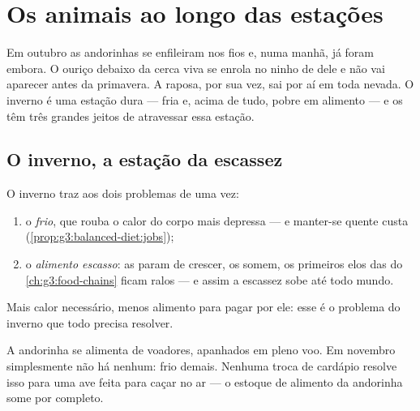 \chapter{Os animais ao longo das estações}\label{ch:g3:animals-through-seasons}

Em outubro as andorinhas se enfileiram nos fios e, numa manhã, já
foram embora. O ouriço debaixo da cerca viva se enrola no ninho de
 dele e não vai aparecer antes da primavera. A raposa, por sua
vez, sai por aí em toda nevada. O inverno é uma estação dura ---
fria e, acima de tudo, pobre em alimento --- e os  têm três
grandes jeitos de atravessar essa estação.

\section{O inverno, a estação da escassez}

\begin{proposition}\label{prop:g3:animals-through-seasons:problem}
O inverno traz aos  dois problemas de uma vez:
\begin{enumerate}
  \item o \emph{frio}, que rouba o calor do corpo mais depressa ---
        e manter-se quente custa 
        (\cref{prop:g3:balanced-diet:jobs});
  \item o \emph{alimento escasso}: as  param de crescer, os
         somem, os primeiros elos das  do
        \cref{ch:g3:food-chains} ficam ralos --- e assim a escassez
        sobe até todo mundo.
\end{enumerate}
Mais calor necessário, menos alimento para pagar por ele: esse é o
problema do inverno que todo  precisa resolver.
\end{proposition}
\admitted

\begin{example}\label{ex:g3:animals-through-seasons:insects}
A andorinha se alimenta de  voadores, apanhados em pleno voo.
Em novembro simplesmente não há nenhum: frio demais. Nenhuma troca
de cardápio resolve isso para uma ave feita para caçar no ar --- o
estoque de alimento da andorinha some por completo.
\end{example}

